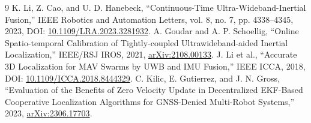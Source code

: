 \documentclass[11pt,a4paper]{ctexart}
\begin{document}
\begin{thebibliography}{9}
 K. Li, Z. Cao, and U. D. Hanebeck,
``Continuous-Time Ultra-Wideband-Inertial Fusion,'' IEEE Robotics and Automation Letters,
vol. 8, no. 7, pp. 4338--4345, 2023, DOI: \href{https://doi.org/10.1109/LRA.2023.3281932}{10.1109/LRA.2023.3281932}.
 A. Goudar and A. P. Schoellig,
``Online Spatio-temporal Calibration of Tightly-coupled Ultrawideband-aided Inertial Localization,''
IEEE/RSJ IROS, 2021, \href{https://arxiv.org/abs/2108.00133}{arXiv:2108.00133}.
 J. Li et al., ``Accurate 3D Localization for MAV Swarms by UWB and IMU Fusion,''
IEEE ICCA, 2018, DOI: \href{https://doi.org/10.1109/ICCA.2018.8444329}{10.1109/ICCA.2018.8444329}.
 C. Kilic, E. Gutierrez, and J. N. Gross,
``Evaluation of the Benefits of Zero Velocity Update in Decentralized EKF-Based Cooperative Localization
Algorithms for GNSS-Denied Multi-Robot Systems,'' 2023,
\href{https://arxiv.org/abs/2306.17703}{arXiv:2306.17703}.
\end{thebibliography}
\end{document}
